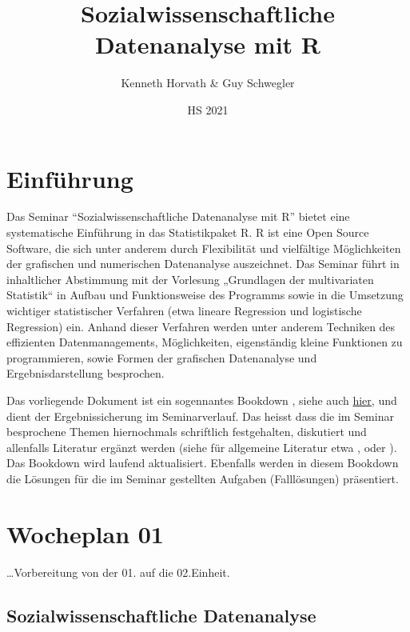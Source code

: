 \documentclass[
]{book}
\title{Sozialwissenschaftliche Datenanalyse mit R}
\author{Kenneth Horvath \& Guy Schwegler}
\date{HS 2021}
\begin{document}
\maketitle

{
\setcounter{tocdepth}{1}
\tableofcontents
}
\hypertarget{einfuxfchrung}{%
\chapter*{Einführung}\label{einfuxfchrung}}

Das Seminar ``Sozialwissenschaftliche Datenanalyse mit R'' bietet eine systematische Einführung in das Statistikpaket R. R ist eine Open Source Software, die sich unter anderem durch Flexibilität und vielfältige Möglichkeiten der grafischen und numerischen Datenanalyse auszeichnet. Das Seminar führt in inhaltlicher Abstimmung mit der Vorlesung „Grundlagen der multivariaten Statistik`` in Aufbau und Funktionsweise des Programms sowie in die Umsetzung wichtiger statistischer Verfahren (etwa lineare Regression und logistische Regression) ein. Anhand dieser Verfahren werden unter anderem Techniken des effizienten Datenmanagements, Möglichkeiten, eigenständig kleine Funktionen zu programmieren, sowie Formen der grafischen Datenanalyse und Ergebnisdarstellung besprochen.

Das vorliegende Dokument ist ein sogennantes Bookdown \citep{R-bookdown}, siehe auch \href{https://bookdown.org/}{hier}, und dient der Ergebnissicherung im Seminarverlauf. Das heisst dass die im Seminar besprochene Themen hiernochmals schriftlich festgehalten, diskutiert und allenfalls Literatur ergänzt werden (siehe für allgemeine Literatur etwa \citet{DiazBone2019}, \citet{Kabacoff2015} oder \citet{Manderscheid2017}). Das Bookdown wird laufend aktualisiert. Ebenfalls werden in diesem Bookdown die Lösungen für die im Seminar gestellten Aufgaben (Falllösungen) präsentiert.

\hypertarget{wocheplan-01}{%
\chapter{Wocheplan 01}\label{wocheplan-01}}

\ldots Vorbereitung von der 01. auf die 02.Einheit.

\hypertarget{sozialwissenschaftliche-datenanalyse}{%
\section{Sozialwissenschaftliche Datenanalyse}\label{sozialwissenschaftliche-datenanalyse}}
\end{document}
